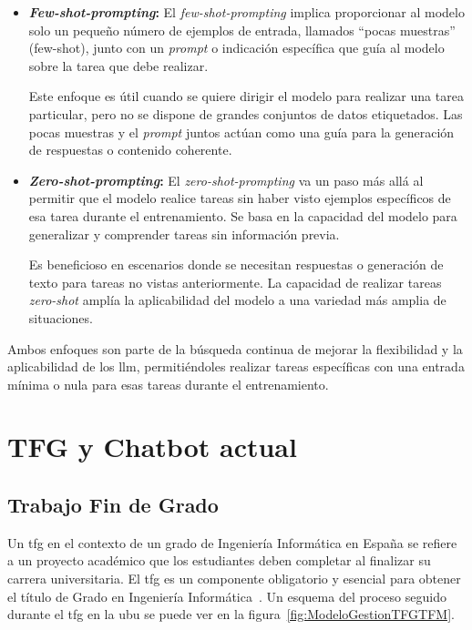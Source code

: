 \begin{itemize}
    \item \textbf{\textit{Few-shot-prompting}:} El \textit{few-shot-prompting} implica proporcionar al modelo solo un pequeño número de ejemplos de entrada, llamados ``pocas muestras'' (few-shot), junto con un \textit{prompt} o indicación específica que guía al modelo sobre la tarea que debe realizar.

    Este enfoque es útil cuando se quiere dirigir el modelo para realizar una tarea particular, pero no se dispone de grandes conjuntos de datos etiquetados. Las pocas muestras y el \textit{prompt} juntos actúan como una guía para la generación de respuestas o contenido coherente.

    \item \textbf{\textit{Zero-shot-prompting}:} El \textit{zero-shot-prompting} va un paso más allá al permitir que el modelo realice tareas sin haber visto ejemplos específicos de esa tarea durante el entrenamiento. Se basa en la capacidad del modelo para generalizar y comprender tareas sin información previa. 

    Es beneficioso en escenarios donde se necesitan respuestas o generación de texto para tareas no vistas anteriormente. La capacidad de realizar tareas \textit{zero-shot} amplía la aplicabilidad del modelo a una variedad más amplia de situaciones.
\end{itemize}

Ambos enfoques son parte de la búsqueda continua de mejorar la flexibilidad y la aplicabilidad de los \acrshort{llm}, permitiéndoles realizar tareas específicas con una entrada mínima o nula para esas tareas durante el entrenamiento.

\section{TFG y Chatbot actual}

\subsection{Trabajo Fin de Grado}

Un \acrfull{tfg} en el contexto de un grado de Ingeniería Informática en España se refiere a un proyecto académico que los estudiantes deben completar al finalizar su carrera universitaria. El \acrshort{tfg} es un componente obligatorio y esencial para obtener el título de Grado en Ingeniería Informática~\cite{ubu-tfg}. Un esquema del proceso seguido durante el \acrshort{tfg} en la \acrshort{ubu} se puede ver en la figura~\ref{fig:ModeloGestionTFGTFM}.

